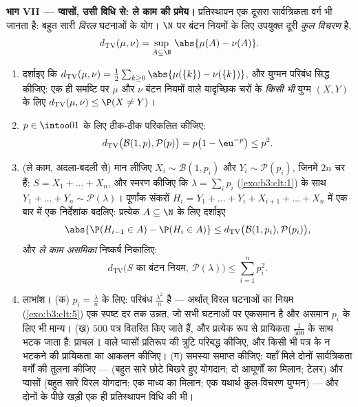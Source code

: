 \begin{problem}[{सप्ताहांत समस्या --- प्रतिस्थापन विधि}]
\medskip
\noindent\textbf{भाग VII --- प्वासों, उसी विधि से: ले काम की
प्रमेय।} प्रतिस्थापन एक दूसरा सार्वत्रिकता वर्ग भी जानता है: बहुत
सारी  \emph{विरल} घटनाओं के योग। $\N$ पर बंटन नियमों के
लिए उपयुक्त दूरी \emph{कुल विचरण} है,
\[
d_{\mathrm{TV}}(\mu, \nu) = \sup_{A\subseteq\N}\,
\abs{\mu(A) - \nu(A)} .
\]
\begin{enumerate}[resume]
  \item दर्शाइए कि $d_{\mathrm{TV}}(\mu, \nu) =
        \frac12\sum_{k\geq0}\abs{\mu(\{k\}) -
        \nu(\{k\})}$, और युग्मन परिबंध सिद्ध कीजिए: एक ही
        समष्टि पर $\mu$ और $\nu$ बंटन नियमों वाले यादृच्छिक चरों
        के \emph{किसी भी} युग्म $(X, Y)$ के लिए $d_{\mathrm{TV}}(\mu, \nu) \leq \P(X \neq Y)$।
  \item $p \in \intoo01$ के लिए ठीक-ठीक परिकलित कीजिए:
        \[
        d_{\mathrm{TV}}\bigl(\mathcal B(1, p), \mathcal
        P(p)\bigr) = p\bigl(1 - \eu^{-p}\bigr) \leq p^2 .
        \]
  \item (ले काम, अदला-बदली से) मान लीजिए $X_i \sim \mathcal B(1,
        p_i)$ और $Y_i \sim \mathcal P(p_i)$, जिनमें
        $2n$ चर  हैं; $S = X_1 + \dots + X_n$, और स्मरण कीजिए कि $\lambda = \sum_ip_i$
        (\cref{exo:b3:clt:1}) के साथ $Y_1 + \dots + Y_n \sim \mathcal P(\lambda)$। पूर्णांक संकरों $H_i = Y_1 + \dots + Y_i + X_{i+1} + \dots
        + X_n$ में एक बार में
        एक निर्देशांक बदलिए: प्रत्येक $A \subseteq \N$ के लिए दर्शाइए
        \[
        \abs{\P(H_{i-1} \in A) - \P(H_i \in A)} \leq
        d_{\mathrm{TV}}\bigl(\mathcal B(1, p_i), \mathcal
        P(p_i)\bigr),
        \]
        और \emph{ले काम असमिका} निष्कर्ष निकालिए:
        \[
        d_{\mathrm{TV}}\bigl(S \text{ का बंटन नियम},\ \mathcal
        P(\lambda)\bigr) \leq \sum_{i=1}^np_i^2 .
        \]
  \item लाभांश। (क) $p_i = \frac\lambda n$ के लिए: परिबंध $\frac{\lambda^2}n$ है --- अर्थात् विरल
        घटनाओं का नियम (\cref{exo:b3:clt:5}) एक स्पष्ट दर तक उन्नत, जो सभी
        घटनाओं पर एकसमान है और असमान $p_i$ के लिए भी मान्य। (ख)
        $500$ पत्र वितरित किए जाते हैं, और प्रत्येक  रूप
        से प्रायिकता $\frac1{500}$ के साथ भटक जाता है: प्राचल $1$ वाले
        प्वासों प्रतिरूप की त्रुटि परिबद्ध कीजिए, और किसी भी पत्र
        के न भटकने की प्रायिकता का आकलन कीजिए। (ग) समस्या समाप्त
        कीजिए: यहाँ मिले दोनों सार्वत्रिकता वर्गों की तुलना कीजिए
        ---  (बहुत सारे छोटे बिखरे हुए योगदान; दो आघूर्णों
        का मिलान; टेलर) और प्वासों (बहुत सारे विरल योगदान; एक
        माध्य का मिलान; एक यथार्थ कुल-विचरण युग्मन) --- और दोनों
        के पीछे खड़ी एक ही प्रतिस्थापन विधि की भी।


\end{enumerate}
\end{problem}
